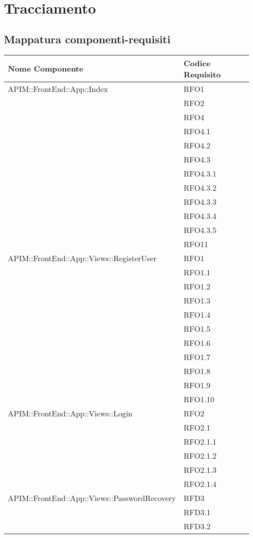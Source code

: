 \newpage
\renewcommand*{\arraystretch}{1.6}

\section{Tracciamento}
\subsection{Mappatura componenti-requisiti}
		\begin{longtable}{ p{12cm} | p{4cm} }
			\hline
			\textbf{Nome Componente} & \textbf{Codice Requisito} \\
			\hline
			APIM::FrontEnd::App::Index
			& RFO1 \\
			& RFO2 \\
			& RFO4 \\
			& RFO4.1 \\
			& RFO4.2 \\
			& RFO4.3 \\
			& RFO4.3.1 \\
			& RFO4.3.2 \\
			& RFO4.3.3 \\
			& RFO4.3.4 \\
			& RFO4.3.5 \\
			& RFO11 \\
			\hline
			APIM::FrontEnd::App::Views::RegisterUser
			& RFO1 \\
			& RFO1.1 \\
			& RFO1.2 \\
			& RFO1.3 \\
			& RFO1.4 \\
			& RFO1.5 \\
			& RFO1.6 \\
			& RFO1.7 \\
			& RFO1.8 \\
			& RFO1.9 \\
			& RFO1.10 \\
			\hline
			APIM::FrontEnd::App::Views::Login
			& RFO2 \\
			& RFO2.1 \\
			& RFO2.1.1 \\
			& RFO2.1.2 \\
			& RFO2.1.3 \\
			& RFO2.1.4 \\
			\hline
			APIM::FrontEnd::App::Views::PasswordRecovery
			& RFD3 \\
			& RFD3.1 \\
			& RFD3.2 \\

\end{longtable}
